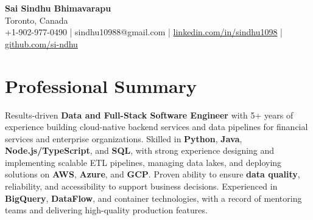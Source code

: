 \documentclass[letterpaper,11pt]{article}
\begin{document}
\begin{center}
  {\Large \textbf{Sai Sindhu Bhimavarapu}} \\
  Toronto, Canada \\
  +1-902-977-0490 \enspace | \enspace sindhu10988@gmail.com \enspace | \enspace \href{https://www.linkedin.com/in/sindhu1098/}{linkedin.com/in/sindhu1098} \enspace | \enspace \href{https://github.com/si-ndhu}{github.com/si-ndhu}
\end{center}

\section{Professional Summary}
  \begin{itemize}[leftmargin=0.15in, label={}]
    \small{\item{
     Results-driven \textbf{Data and Full-Stack Software Engineer} with 5+ years of experience building cloud-native backend services and data pipelines for financial services and enterprise organizations. Skilled in \textbf{Python}, \textbf{Java}, \textbf{Node.js/TypeScript}, and \textbf{SQL}, with strong experience designing and implementing scalable ETL pipelines, managing data lakes, and deploying solutions on \textbf{AWS}, \textbf{Azure}, and \textbf{GCP}. Proven ability to ensure \textbf{data quality}, reliability, and accessibility to support business decisions. Experienced in \textbf{BigQuery}, \textbf{DataFlow}, and container technologies, with a record of mentoring teams and delivering high-quality production features.
    }}
  \end{itemize}
\vspace{-16pt}

\end{document}
